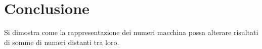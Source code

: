 \documentclass[10pt,a4paper]{article}
\begin{document}
\section{Conclusione}
Si dimostra come la rappresentazione dei numeri macchina possa alterare risultati di somme di numeri distanti tra loro.
\end{document}
